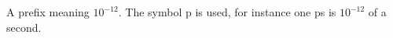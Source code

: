 A prefix meaning $10^{-12}.$  The symbol p is used, for instance one ps
is $10^{-12}$  of a second.

